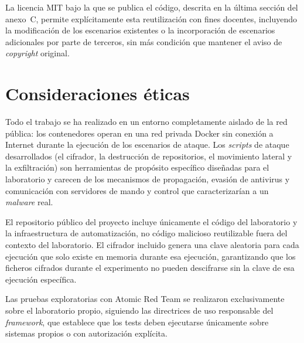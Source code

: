 \documentclass[../main.tex]{subfiles}
\begin{document}
La licencia MIT bajo la que se publica el código, descrita en la última
sección del anexo~C, permite explícitamente esta reutilización con fines
docentes, incluyendo la modificación de los escenarios existentes o la
incorporación de escenarios adicionales por parte de terceros, sin más
condición que mantener el aviso de \emph{copyright} original.

\section{Consideraciones éticas}

Todo el trabajo se ha realizado en un entorno completamente aislado de la red
pública: los contenedores operan en una red privada Docker sin conexión a Internet
durante la ejecución de los escenarios de ataque. Los \emph{scripts} de ataque
desarrollados (el cifrador, la destrucción de repositorios, el movimiento lateral
y la exfiltración) son herramientas de propósito específico diseñadas para el
laboratorio y carecen de los mecanismos de propagación, evasión de antivirus y
comunicación con servidores de mando y control que caracterizarían a un
\emph{malware} real.

El repositorio público del proyecto incluye únicamente el código del laboratorio y
la infraestructura de automatización, no código malicioso reutilizable fuera del
contexto del laboratorio. El cifrador incluido genera una clave aleatoria para
cada ejecución que solo existe en memoria durante esa ejecución, garantizando que
los ficheros cifrados durante el experimento no pueden descifrarse sin la clave de
esa ejecución específica.

Las pruebas exploratorias con Atomic Red Team se realizaron exclusivamente sobre el
laboratorio propio, siguiendo las directrices de uso responsable del
\emph{framework}, que establece que los tests deben ejecutarse únicamente sobre
sistemas propios o con autorización explícita.
\end{document}
